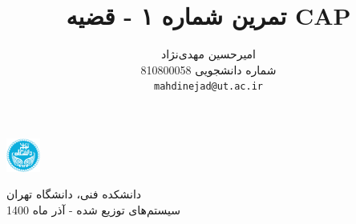 \documentclass{article}
\title{تمرین شماره ۱ - قضیه CAP}
\author{%
  امیرحسین مهدی‌نژاد\\
  شماره دانشجویی 810800058\\
  \texttt{mahdinejad@ut.ac.ir} \\
}
\begin{document}
\begin{minipage}{0.1\textwidth}%
\includegraphics[width=1.1cm]{Photos/HW1/UT_logo.png}
\end{minipage}%
\hfill%
\begin{minipage}{0.9\textwidth}\raggedleft
دانشکده فنی، دانشگاه تهران\\
سیستم‌های توزیع شده - 
آذر
ماه 1400\\
\end{minipage}


\makepertitle


\end{document}
